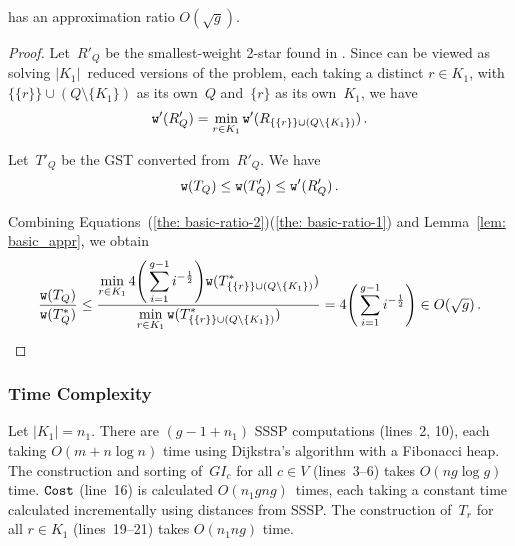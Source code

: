 \begin{theorem}
\label{the: basic-ratio}
    \Basic has an approximation ratio $O(\sqrt{g})$.
\end{theorem}
\begin{proof}
    Let~$R'_Q$ be the smallest-weight 2-star found in \Basic. Since \Basic can be viewed as solving $|K_1|$~reduced versions of the problem, each taking a distinct $r \in K_1$, with $\{\{r\}\}\cup( Q\setminus \{K_1\})$ as its own~$Q$ and~$\{r\}$ as its own~$K_1$, we have
    \begin{gather}
    \label{the: basic-ratio-1}
        \mathtt{w}'(R'_Q) = \min_{r\in K_1}\mathtt{w}'(R_{\{\{r\}\}\cup( Q\setminus \{K_1\})}) \,.
    \end{gather}

    Let~$T'_Q$ be the GST converted from~$R'_Q$. We have
    \begin{gather}
    \label{the: basic-ratio-2}
        \mathtt{w}(T_{Q}) \leq \mathtt{w}(T'_{Q}) \leq \mathtt{w}'(R'_Q) \,.
    \end{gather}

    Combining Equations~(\ref{the: basic-ratio-2})(\ref{the: basic-ratio-1}) and Lemma~\ref{lem: basic_appr}, we obtain
    \begin{equation}
    \resizebox{0.92\linewidth}{!}{$
    \displaystyle
    \begin{aligned}
    \label{eq: appr_5}
         \frac{\w(T_{Q})}{\w(T^*_Q)} \leq \frac{\displaystyle\min_{r\in K_1}{4\Bigg(\sum_{i=1}^{g-1}i^{-\frac 1 2}\Bigg) \w(T^*_{\{\{r\}\}\cup( Q\setminus \{K_1\})})}}{\displaystyle\min_{r\in K_1}{\w(T^*_{\{\{r\}\}\cup( Q\setminus \{K_1\})})}} = 4\Bigg(\sum_{i=1}^{g-1}i^{-\frac 1 2}\Bigg) \in O(\sqrt{g}) \,.
    \end{aligned}
    $}
    \end{equation}
\end{proof}

\subsubsection{Time Complexity}
\label{subsubsec: basic-time}

Let $|K_1| = n_1$. There are $(g-1+n_1)$ SSSP computations (lines~2, 10), each taking $O(m+n\log{n})$ time using Dijkstra's algorithm with a Fibonacci heap. The construction and sorting of~$GI_c$ for all $c \in V$ (lines~3--6) takes $O(ng\log{g})$ time. $\mathtt{Cost}$ (line~16) is calculated $O(n_1gng)$~times, each taking a constant time calculated incrementally using distances from SSSP. The construction of~$T_r$ for all $r \in K_1$ (lines~19--21) takes $O(n_1ng)$ time.

